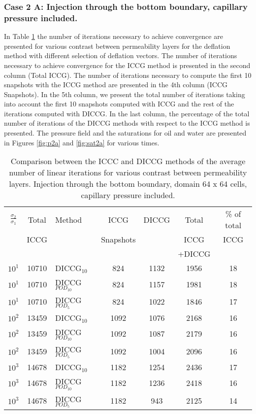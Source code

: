 \documentclass[12pt]{article}
\begin{document}
\subsubsection*{Case 2 A: Injection through the bottom boundary, capillary pressure included.}
In Table \ref{table:liter2a} the number of iterations necessary to achieve convergence are presented for various contrast between permeability layers for the deflation method with different selection of deflation vectors. The number of iterations necessary to achieve convergence for the ICCG method is presented in the second column (Total ICCG). The number of iterations necessary to compute the first 10 snapshots with the ICCG method are presented in the 4th column (ICCG Snapshots). In the 5th column, we present the total number of iterations taking into account the first 10 snapshots computed with ICCG and the rest of the iterations computed with DICCG. In the last column, the percentage of the total number of iterations of the DICCG methods with respect to the ICCG method is presented.   
The pressure field and the saturations for oil and water are presented in Figures \ref{fig:p2a} and \ref{fig:sat2a} for various times.
\begin{table}[!h]\centering
\begin{minipage}{1\textwidth}
 \centering
\begin{tabular}{ ||c|c||l|c|c|c|c||} 
\hline
$\frac{\sigma_2}{\sigma_1}$&Total&Method  & ICCG&DICCG &Total&\% of total\\ 
                           & ICCG     &  & Snapshots& &ICCG& ICCG\\ 
                            &     &  & & &+DICCG& \\
\hline 
$10^{1}$ &10710& DICCG$_{10}$&824&1132&1956&18\\ 
\hline  
$10^{1}$ &10710& DICCG$_{POD_{10}}$&824&1157&1981&18 \\ 
\hline  
$10^{1}$ &10710& DICCG$_{POD_{5}}$&824&1022&1846&17 \\ 
\hline 
$10^{2}$ &13459& DICCG$_{10}$&1092&1076&2168&16\\ 
\hline  
$10^{2}$ &13459& DICCG$_{POD_{10}}$&1092&1087&2179&16 \\ 
\hline  
$10^{2}$ &13459& DICCG$_{POD_{5}}$&1092&1004&2096&16 \\ 
\hline  
$10^{3}$ &14678& DICCG$_{10}$&1182&1254&2436&17\\ 
\hline  
$10^{3}$ &14678& DICCG$_{POD_{10}}$&1182&1236&2418&16 \\ 
\hline  
$10^{3}$ &14678& DICCG$_{POD_{5}}$&1182&943&2125&14 \\ 
\hline
\end{tabular} 
\caption{Comparison between the ICCC and DICCG methods of the average number of linear iterations for various contrast between permeability layers. Injection through the bottom boundary, domain 64 x 64 cells, capillary pressure included.}\label{table:liter2a} 
\end{minipage}  
\end{table}  
\end{document}
